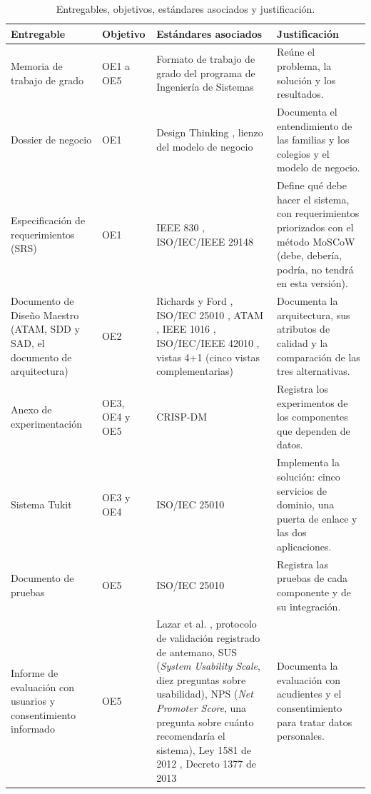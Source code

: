 \begin{table}[htbp]
\centering\footnotesize
\setlength{\tabcolsep}{4pt}
\renewcommand{\arraystretch}{1.1}
\caption{Entregables, objetivos, estándares asociados y justificación.}
\label{tab:entregables}
\begin{tabularx}{\textwidth}{@{}p{3cm}p{1.4cm}p{3.2cm}X@{}}
\toprule
Entregable & Objetivo & Estándares asociados & Justificación \\
\midrule
Memoria de trabajo de grado & OE1 a OE5 &
Formato de trabajo de grado del programa de Ingeniería de Sistemas &
Reúne el problema, la solución y los resultados. \\
Dossier de negocio & OE1 &
Design Thinking \citep{brown_design_2008}, lienzo del modelo de negocio
\citep{osterwalder_business_2010} &
Documenta el entendimiento de las familias y los colegios y el modelo de negocio. \\
Especificación de requerimientos (SRS) & OE1 &
IEEE 830 \citep{ieee_830_1998}, ISO/IEC/IEEE 29148 \citep{iso_29148_2018} &
Define qué debe hacer el sistema, con requerimientos priorizados con el método MoSCoW (debe, debería,
podría, no tendrá en esta versión). \\
Documento de Diseño Maestro (ATAM, SDD y SAD, el documento de arquitectura) & OE2 &
Richards y Ford \citep{richards_fundamentals_2025}, ISO/IEC 25010 \citep{iso_25010_2011},
ATAM \citep{bass_software_2021}, IEEE 1016 \citep{ieee_1016_2009}, ISO/IEC/IEEE 42010
\citep{iso_42010_2022}, vistas 4+1 (cinco vistas complementarias) \citep{kruchten_41_1995} &
Documenta la arquitectura, sus atributos de calidad y la comparación de las tres alternativas. \\
Anexo de experimentación & OE3, OE4 y OE5 &
CRISP-DM \citep{chapman_crisp-dm_2000} &
Registra los experimentos de los componentes que dependen de datos. \\
Sistema Tukit & OE3 y OE4 &
ISO/IEC 25010 \citep{iso_25010_2011} &
Implementa la solución: cinco servicios de dominio, una puerta de enlace y las dos aplicaciones. \\
Documento de pruebas & OE5 &
ISO/IEC 25010 \citep{iso_25010_2011} &
Registra las pruebas de cada componente y de su integración. \\
Informe de evaluación con usuarios y consentimiento informado & OE5 &
Lazar et al. \citep{lazar_research_2017}, protocolo de validación registrado de antemano, SUS
\citep{brooke_sus_1996} (\emph{System Usability Scale}, diez preguntas sobre usabilidad), NPS
\citep{reichheld_one_2003} (\emph{Net Promoter Score}, una pregunta sobre cuánto recomendaría el sistema), Ley 1581 de 2012 \citep{congreso_ley1581_2012}, Decreto 1377
de 2013 \citep{presidencia_decreto1377_2013} &
Documenta la evaluación con acudientes y el consentimiento para tratar datos personales. \\
\bottomrule
\end{tabularx}
\end{table}


